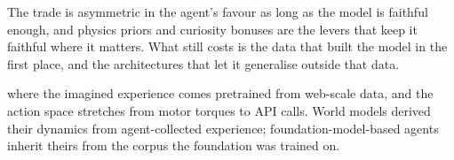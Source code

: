 
The trade is asymmetric in the agent's favour as long as the model is faithful enough,
and physics priors and curiosity bonuses are the levers that keep it faithful where it matters.
What still costs is the data that built the model in the first place,
and the architectures that let it generalise outside that data.

where the imagined experience comes pretrained from web-scale data,
and the action space stretches from motor torques to API calls.
World models derived their dynamics from agent-collected experience;
foundation-model-based agents inherit theirs from the corpus the foundation was trained on.

